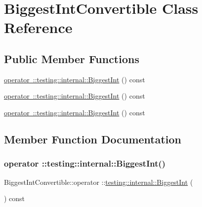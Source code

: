 \hypertarget{class_biggest_int_convertible}{}\section{Biggest\+Int\+Convertible Class Reference}
\label{class_biggest_int_convertible}
\subsection*{Public Member Functions}
\begin{DoxyCompactItemize}
\item 
\mbox{\hyperlink{class_biggest_int_convertible_a080f0dcdd3feff9a45be79492530129a}{operator \+::testing\+::internal\+::\+Biggest\+Int}} () const
\item 
\mbox{\hyperlink{class_biggest_int_convertible_a080f0dcdd3feff9a45be79492530129a}{operator \+::testing\+::internal\+::\+Biggest\+Int}} () const
\item 
\mbox{\hyperlink{class_biggest_int_convertible_a080f0dcdd3feff9a45be79492530129a}{operator \+::testing\+::internal\+::\+Biggest\+Int}} () const
\end{DoxyCompactItemize}


\subsection{Member Function Documentation}
\mbox{\label{class_biggest_int_convertible_a080f0dcdd3feff9a45be79492530129a}} 
\subsubsection{\texorpdfstring{operator ::testing::internal::BiggestInt()}{operator ::testing::internal::BiggestInt()}\hspace{0.1cm}{\footnotesize\ttfamily [1/3]}}
{\footnotesize\ttfamily Biggest\+Int\+Convertible\+::operator \+::\mbox{\hyperlink{namespacetesting_1_1internal_a05c6bd9ede5ccdf25191a590d610dcc6}{testing\+::internal\+::\+Biggest\+Int}} (\begin{DoxyParamCaption}{ }\end{DoxyParamCaption}) const\hspace{0.3cm}{\ttfamily [inline]}}

